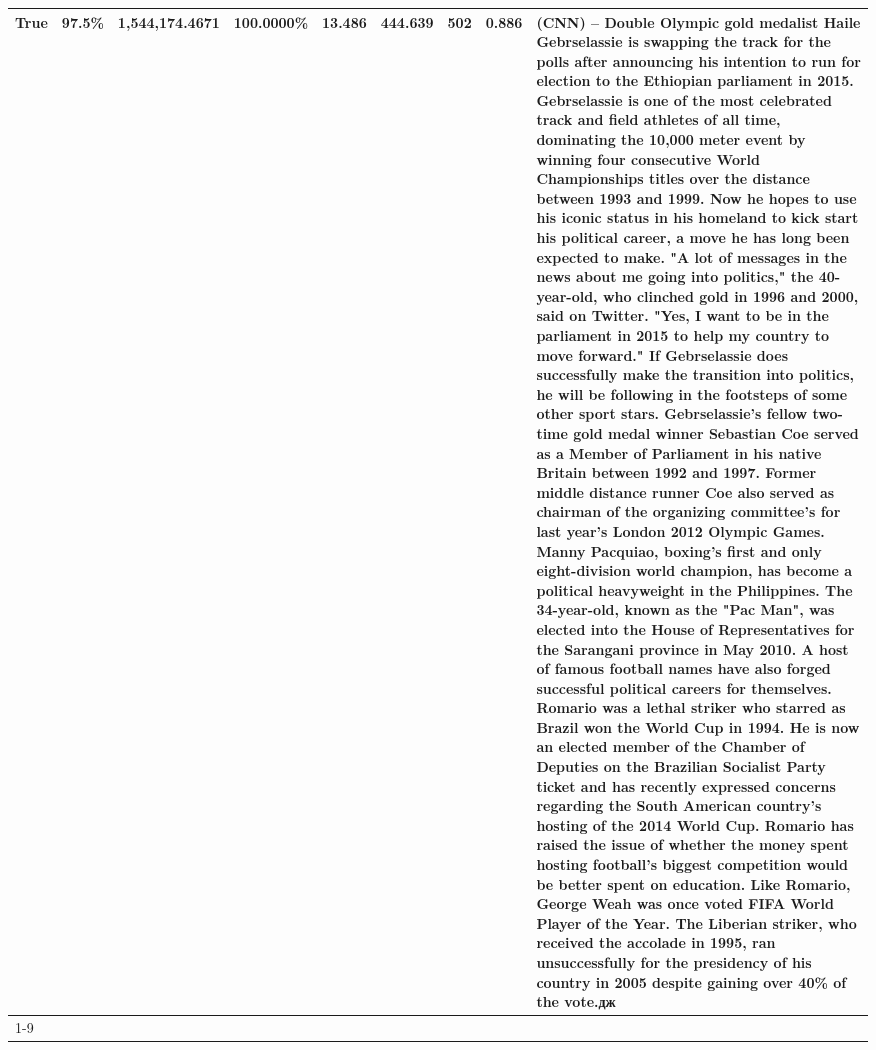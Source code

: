 \begin{table}[H]
{\begin{tabular}{lllrlllll}
True & 97.5\% & 1,544,174.4671 & \bfseries \color{red} 100.0000\% & 13.486 & 444.639 & 502 & 0.886 & (CNN) -- Double Olympic gold medalist Haile Gebrselassie is swapping the track for the polls after announcing his intention to run for election to the Ethiopian parliament in 2015. Gebrselassie is one of the most celebrated track and field athletes of all time, dominating the 10,000 meter event by winning four consecutive World Championships titles over the distance between 1993 and 1999. Now he hopes to use his iconic status in his homeland to kick start his political career, a move he has long been expected to make. "A lot of messages in the news about me going into politics," the 40-year-old, who clinched gold in 1996 and 2000, said on Twitter. "Yes, I want to be in the parliament in 2015 to help my country to move forward." If Gebrselassie does successfully make the transition into politics, he will be following in the footsteps of some other sport stars. Gebrselassie's fellow two-time gold medal winner Sebastian Coe served as a Member of Parliament in his native Britain between 1992 and 1997. Former middle distance runner Coe also served as chairman of the organizing committee's for last year's London 2012 Olympic Games. Manny Pacquiao, boxing's first and only eight-division world champion, has become a political heavyweight in the Philippines. The 34-year-old, known as the "Pac Man", was elected into the House of Representatives for the Sarangani province in May 2010. A host of famous football names have also forged successful political careers for themselves. Romario was a lethal striker who starred as Brazil won the World Cup in 1994. He is now an elected member of the Chamber of Deputies on the Brazilian Socialist Party ticket and has recently expressed concerns regarding the South American country's hosting of the 2014 World Cup. Romario has raised the issue of whether the money spent hosting football's biggest competition would be better spent on education. Like Romario, George Weah was once voted FIFA World Player of the Year. The Liberian striker, who received the accolade in 1995, ran unsuccessfully for the presidency of his country in 2005 despite gaining over 40\% of the vote.дж \\
\cline{1-9}

\end{tabular}}
\end{table}
